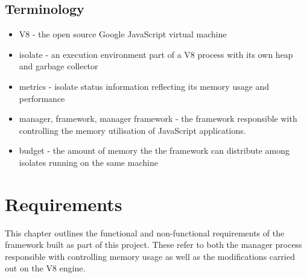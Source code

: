 \documentclass{l4proj}
\begin{document}
\section{Terminology}
\begin{itemize}
\item V8 - the open source Google JavaScript virtual machine
\item isolate - an execution environment part of a V8 process with its own heap and garbage collector
\item metrics - isolate status information reflecting its memory usage and performance
\item manager, framework, manager framework - the framework responsible with controlling the memory utilisation of JavaScript applications.
\item budget - the amount of memory the the framework can distribute among isolates running on the same machine
\end{itemize}
\chapter{Requirements}
\hspace*{3em} This chapter outlines the functional and non-functional requirements of the framework built as part of this project. These refer to both the manager process responsible with controlling memory usage as well as the modifications carried out on the V8 engine. 
\end{document}
